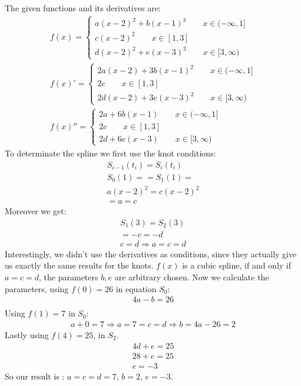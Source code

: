 The given functions and its derivatives are:
\begin{gather*}
f(x) = \begin{cases}
a(x-2)^2 + b(x-1) ^3 \quad\quad x \in (-\infty,1]\\
c(x-2)^2 \quad\quad x\in [1,3]\\
d(x-2)^2 + e(x-3)^3 \quad \quad x \in [3,\infty)
\end{cases}\\
f(x)' =\begin{cases}
2a(x-2) + 3b(x-1)^2 \quad \quad x \in (-\infty,1]\\
2c \quad\quad x\in [1,3]\\
2d(x-2) + 3e(x-3)^2 \quad \quad x \in [3,\infty)
\end{cases}\\
f(x)''=\begin{cases}
2a + 6b(x-1) \quad \quad x \in (-\infty,1]\\
2c \quad\quad x\in [1,3]\\
2d + 6e(x-3) \quad \quad x \in [3,\infty)
\end{cases}
\end{gather*}
To determinate the spline we first use the knot conditions:
\begin{gather*}
S_{i-1}(t_i) = S_{i}(t_i) \\
S_0(1) =  = S_1(1) =\\
a(x-2)^2 = c(x-2)^2\\
= a = c
\end{gather*}
Moreover we get:
\begin{gather*}
S_1(3) = S_2(3) \\
= -c = -d \\
c = d \Rightarrow a = c = d
\end{gather*}
Interestingly, we didn't use the derivatives as conditions, since they actually give us exactly the same results for the knots.
$f(x)$ is a cubic spline, if and only if $a = c = d$, the parameters $b,e$ are arbitrary chosen.
Now we calculate the parameters, using $f(0) = 26$ in equation $S_0$:
\begin{gather*}
4a - b = 26\\
\end{gather*}
Using $f(1) = 7$ in $S_0$:
\begin{gather*}
a+0  = 7 \Rightarrow a = 7 = c = d \Rightarrow b = 4a -26 = 2
\end{gather*}
Lastly using $f(4) = 25$, in $S_2$.
\begin{gather*}
4d + e = 25\\
28 + e = 25\\
e= -3 
\end{gather*}
So our result is : $a = c =d = 7$, $b =2$, $e = -3$.


